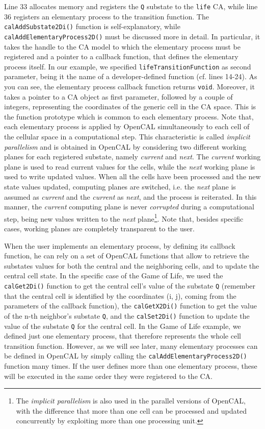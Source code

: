 Line 33 allocates memory and registers the \verb'Q' substate to the
\verb'life' CA, while line 36 registers an elementary process to the
transition function. The \verb'calAddSubstate2Di()' function is
self-explanatory, while \verb'calAddElementaryProcess2D()' must be
discussed more in detail. In particular, it takes the handle to the CA
model to which the elementary process must be registered and a pointer
to a callback function, that defines the elementary process itself. In
our example, we specified \verb'lifeTransitionFunction' as second
parameter, being it the name of a developer-defined function
(cf. lines 14-24). As you can see, the elementary process callback
function returns \verb'void'. Moreover, it takes a pointer to a CA
object as first parameter, followed by a couple of integers,
representing the coordinates of the generic cell in the CA space. This
is the function prototype which is common to each elementary
process. Note that, each elementary process is applied by OpenCAL
simultaneously to each cell of the cellular space in a computational
step. This characteristic is called \emph{implicit parallelism} and is
obtained in OpenCAL by considering two different working planes for
each registered substate, namely \emph{current} and \emph{next}. The
\emph{current} working plane is used to read current values for the
cells, while the \emph{next} working plane is used to write updated
values. When all the cells have been processed and the new state
values updated, computing planes are switched, i.e. the \emph{next}
plane is assumed as \emph{current} and the \emph{current} as
\emph{next}, and the process is reiterated. In this manner, the
\emph{current} computing plane is never \emph{corrupted} during a
computational step, being new values written to the \emph{next}
plane\footnote{The \emph{implicit parallelism} is also used in the
  parallel versions of OpenCAL, with the difference that more than one
  cell can be processed and updated concurrently by exploiting more
  than one processing unit.}. Note that, besides specific cases,
working planes are completely transparent to the user.

When the user implements an elementary process, by defining its
callback function, he can rely on a set of OpenCAL functions that
allow to retrieve the substates values for both the central and the
neighboring cells, and to update the central cell state. In the
specific case of the Game of Life, we used the \verb'calGet2Di()'
function to get the central cell's value of the substate \verb'Q'
(remember that the central cell is identified by the coordinates (i,
j), coming from the parameters of the callback function), the
\verb'calGetX2Di()' function to get the value of the n-th neighbor's
substate \verb'Q', and the \verb'calSet2Di()' function to update the
value of the substate \verb'Q' for the central cell. In the Game of
Life example, we defined just one elementary process, that therefore
represents the whole cell transition function. However, as we will see
later, many elementary processes can be defined in OpenCAL by simply
calling the \verb'calAddElementaryProcess2D()' function many times. If
the user defines more than one elementary process, these will be
executed in the same order they were registered to the CA.

